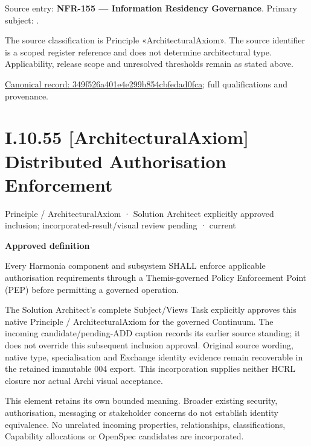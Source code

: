 Source entry: \textbf{NFR-155 — Information Residency Governance}. Primary subject: \texttt{}.



The source classification is Principle «ArchitecturalAxiom». The source identifier is a scoped register reference and does not determine architectural type. Applicability, release scope and unresolved thresholds remain as stated above.


{\footnotesize \href{../../../../../../../../continuum/motivation/principle/architectural-axiom/349f526a401e4e299b854cbfedad0fca.md}{Canonical record: 349f526a401e4e299b854cbfedad0fca}; full qualifications and provenance.}\par
\section*{I.10.55 [ArchitecturalAxiom] Distributed Authorisation Enforcement}
\label{navigation:I.10.55}

\label{element:172720628fa540928e34b52562c7067f}
{\small Principle / ArchitecturalAxiom · Solution Architect explicitly approved inclusion; incorporated-result/visual review pending · current}\par

\par\medskip\textbf{Approved definition}\par


Every Harmonia component and subsystem SHALL enforce applicable authorisation requirements through a Themis-governed Policy Enforcement Point (PEP) before permitting a governed operation.



The Solution Architect's complete Subject/Views Task explicitly approves this
native Principle / ArchitecturalAxiom for the governed Continuum.
The incoming candidate/pending-ADD caption records its earlier source standing;
it does not override this subsequent inclusion approval. Original source wording,
native type, specialisation and Exchange identity evidence remain recoverable in
the retained immutable 004 export. This incorporation supplies neither HCRL closure
nor actual Archi visual acceptance.



This element retains its own bounded meaning. Broader existing security,
authorisation, messaging or stakeholder concerns do not establish identity
equivalence. No unrelated incoming properties, relationships, classifications,
Capability allocations or OpenSpec candidates are incorporated.


